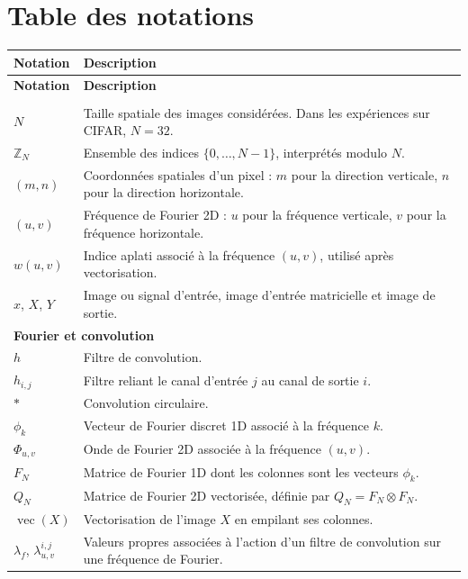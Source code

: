 
\chapter*{Table des notations}

\renewcommand{\arraystretch}{1.35}
\small

\begin{longtable}{p{3cm} p{10.5cm}}
    \hline
    \textbf{Notation} & \textbf{Description} \\
    \hline
    \endfirsthead

    \hline
    \textbf{Notation} & \textbf{Description} \\
    \hline
    \endhead

    \hline
    \endfoot

    \multicolumn{2}{l}{\textbf{Indices, images et fréquences}} \\
    \hline
    $N$ & Taille spatiale des images considérées. Dans les expériences sur CIFAR, $N=32$. \\
    $\mathbb{Z}_N$ & Ensemble des indices $\{0,\dots,N-1\}$, interprétés modulo $N$. \\
    $(m,n)$ & Coordonnées spatiales d'un pixel : $m$ pour la direction verticale, $n$ pour la direction horizontale. \\
    $(u,v)$ & Fréquence de Fourier 2D : $u$ pour la fréquence verticale, $v$ pour la fréquence horizontale. \\
    $w(u,v)$ & Indice aplati associé à la fréquence $(u,v)$, utilisé après vectorisation. \\
    $x$, $X$, $Y$ & Image ou signal d'entrée, image d'entrée matricielle et image de sortie. \\

    \hline
    \multicolumn{2}{l}{\textbf{Fourier et convolution}} \\
    \hline
    $h$ & Filtre de convolution. \\
    $h_{i,j}$ & Filtre reliant le canal d'entrée $j$ au canal de sortie $i$. \\
    $*$ & Convolution circulaire. \\
    $\phi_k$ & Vecteur de Fourier discret 1D associé à la fréquence $k$. \\
    $\Phi_{u,v}$ & Onde de Fourier 2D associée à la fréquence $(u,v)$. \\
    $F_N$ & Matrice de Fourier 1D dont les colonnes sont les vecteurs $\phi_k$. \\
    $Q_N$ & Matrice de Fourier 2D vectorisée, définie par $Q_N = F_N \otimes F_N$. \\
    $\operatorname{vec}(X)$ & Vectorisation de l'image $X$ en empilant ses colonnes. \\
    $\lambda_f$, $\lambda^{i,j}_{u,v}$ & Valeurs propres associées à l'action d'un filtre de convolution sur une fréquence de Fourier. \\


\end{longtable}
